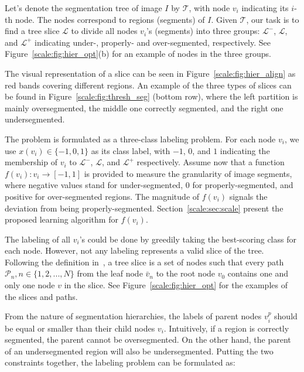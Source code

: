 Let's denote the segmentation tree of image $I$ by $\mathcal{T}$, with
node $v_i$ indicating its $i$-th node. The nodes correspond to regions
(segments) of $I$.  Given $\mathcal{T}$, our task is to find a tree
slice $\mathcal{L}$ to divide all nodes $v_i$'s (segments) into three
groups: $\mathcal{L}^-$, $\mathcal{L}$, and $\mathcal{L}^+$ indicating
under-, properly- and over-segmented, respectively. See
Figure~\ref{scale:fig:hier_opt}(b) for an example of nodes in the three
groups.

The visual representation of a slice can be seen in Figure~\ref{scale:fig:hier_align}
as red bands covering different regions.
An example of the three types of slices can be found in Figure~\ref{scale:fig:thresh_seg} (bottom row),
where the left partition is mainly oversegmented, the middle one correctly segmented, and the right one undersegmented.

The problem is formulated as a three-class labeling problem.
For each node $v_i$, we use $x(v_i) \in\{-1,0,1\}$ as its class label, with $-1$,
$0$, and $1$ indicating the membership of $v_i$ to $\mathcal{L}^-$, 
$\mathcal{L}$, and $\mathcal{L}^+$ respectively.  Assume now that a
function $f(v_i): v_i \rightarrow [-1, 1] $ is provided to measure the
granularity of image segments, where negative values stand for
under-segmented, $0$ for properly-segmented, and positive for
over-segmented regions.
The magnitude of $f(v_i)$ signals the deviation from being properly-segmented.
Section~\ref{scale:sec:scale} present the proposed learning algorithm for $f(v_i)$.  

The labeling of all $v_i$'s could be done by greedily taking the best-scoring class for each node.
However, not any labeling represents a valid slice of the tree.
Following the definition
in~\citep{pont2012supervised,xu2013flattening}, a tree slice is a set
of nodes such that every path $\mathcal{P}_n, n\in \{1,2, ..., N\}$
from the leaf node $\bar{v}_n$ to the root node $v_0$ contains one and
only one node $v$ in the slice. See Figure~\ref{scale:fig:hier_opt} for the
examples of the slices and paths.

From the nature of segmentation hierarchies, the labels of parent nodes $v^p_i$
should be equal or smaller than their child nodes $v_i$.
Intuitively, if a region is correctly segmented, the parent cannot be oversegmented. On the other hand, the parent of an undersegmented region will also be undersegmented.
Putting the two constraints together, the labeling problem can be
formulated as:

